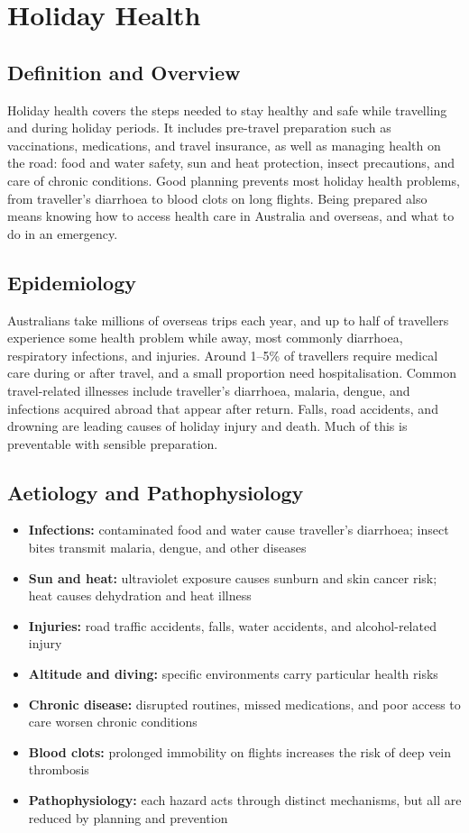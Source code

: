 \chapter{Holiday Health}

\section*{Definition and Overview}
Holiday health covers the steps needed to stay healthy and safe while travelling and during holiday periods. It includes pre-travel preparation such as vaccinations, medications, and travel insurance, as well as managing health on the road: food and water safety, sun and heat protection, insect precautions, and care of chronic conditions. Good planning prevents most holiday health problems, from traveller's diarrhoea to blood clots on long flights. Being prepared also means knowing how to access health care in Australia and overseas, and what to do in an emergency.

\section*{Epidemiology}
Australians take millions of overseas trips each year, and up to half of travellers experience some health problem while away, most commonly diarrhoea, respiratory infections, and injuries. Around 1--5\% of travellers require medical care during or after travel, and a small proportion need hospitalisation. Common travel-related illnesses include traveller's diarrhoea, malaria, dengue, and infections acquired abroad that appear after return. Falls, road accidents, and drowning are leading causes of holiday injury and death. Much of this is preventable with sensible preparation.

\section*{Aetiology and Pathophysiology}
\begin{itemize}
    \item \textbf{Infections:} contaminated food and water cause traveller's diarrhoea; insect bites transmit malaria, dengue, and other diseases
    \item \textbf{Sun and heat:} ultraviolet exposure causes sunburn and skin cancer risk; heat causes dehydration and heat illness
    \item \textbf{Injuries:} road traffic accidents, falls, water accidents, and alcohol-related injury
    \item \textbf{Altitude and diving:} specific environments carry particular health risks
    \item \textbf{Chronic disease:} disrupted routines, missed medications, and poor access to care worsen chronic conditions
    \item \textbf{Blood clots:} prolonged immobility on flights increases the risk of deep vein thrombosis
    \item \textbf{Pathophysiology:} each hazard acts through distinct mechanisms, but all are reduced by planning and prevention
\end{itemize}

